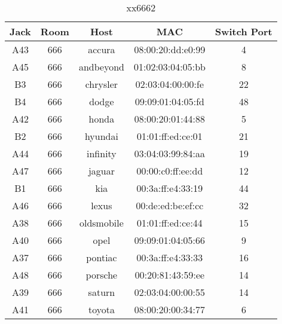 \documentclass{article}
\begin{document}
\begin{table}[H]
\caption{xx6662} \label{tab:title}
\centering
\begin{tabular}{ | c | c | c | c | c | } \hline
Jack & Room & Host & MAC & Switch Port \\ \hline
A43 & 666 & accura & 08:00:20:dd:e0:99 & 4
 \\ \hline
A45 & 666 & andbeyond & 01:02:03:04:05:bb & 8
 \\ \hline
B3 & 666 & chrysler & 02:03:04:00:00:fe & 22
 \\ \hline
B4 & 666 & dodge & 09:09:01:04:05:fd & 48
 \\ \hline
A42 & 666 & honda & 08:00:20:01:44:88 & 5
 \\ \hline
B2 & 666 & hyundai & 01:01:ff:ed:ce:01 & 21
 \\ \hline
A44 & 666 & infinity & 03:04:03:99:84:aa & 19
 \\ \hline
A47 & 666 & jaguar & 00:00:c0:ff:ee:dd & 12
 \\ \hline
B1 & 666 & kia & 00:3a:ff:e4:33:19 & 44
 \\ \hline
A46 & 666 & lexus & 00:de:ed:be:ef:cc & 32
 \\ \hline
A38 & 666 & oldsmobile & 01:01:ff:ed:ce:44 & 15
 \\ \hline
A40 & 666 & opel & 09:09:01:04:05:66 & 9
 \\ \hline
A37 & 666 & pontiac & 00:3a:ff:e4:33:33 & 16
 \\ \hline
A48 & 666 & porsche & 00:20:81:43:59:ee & 14
 \\ \hline
A39 & 666 & saturn & 02:03:04:00:00:55 & 14
 \\ \hline
A41 & 666 & toyota & 08:00:20:00:34:77 & 6
 \\ \hline
\end{tabular}
\end{table}
\end{document}
